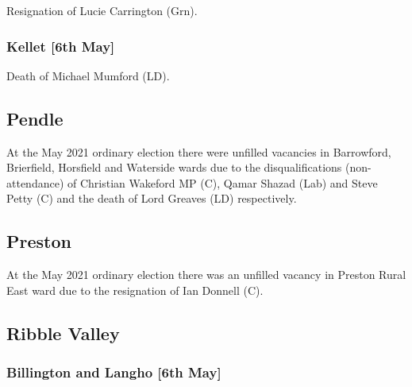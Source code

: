 \documentclass[a4paper,openany]{book}
\begin{document}
\begin{resultsiii}

Resignation of Lucie Carrington (Grn).

\subsubsection*{Kellet \hspace*{\fill}\nolinebreak[1]%
	\enspace\hspace*{\fill}
	[6th May]}


Death of Michael Mumford (LD).

\subsection*{Pendle}

At the May 2021 ordinary election there were unfilled vacancies in Barrowford, Brierfield, Horsfield and Waterside wards due to the disqualifications (non-attendance) of Christian Wakeford MP (C), Qamar Shazad (Lab) and Steve Petty (C) and the death of Lord Greaves (LD) respectively.

\subsection*{Preston}

At the May 2021 ordinary election there was an unfilled vacancy in Preston Rural East ward due to the resignation of Ian Donnell (C).

\subsection*{Ribble Valley}

\subsubsection*{Billington and Langho \hspace*{\fill}\nolinebreak[1]%
	\enspace\hspace*{\fill}
	[6th May]}


\end{resultsiii}
\end{document}
